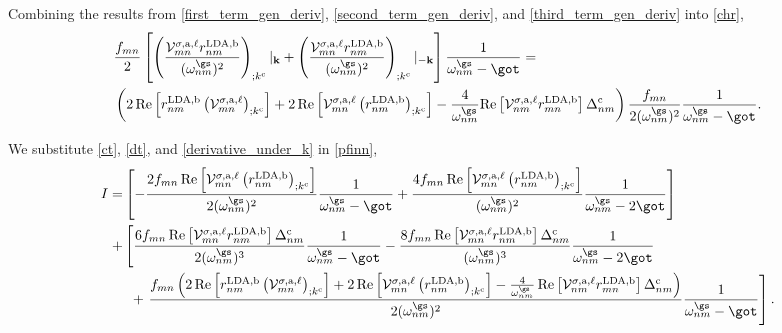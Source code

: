 Combining the results from \eqref{first_term_gen_deriv},
\eqref{second_term_gen_deriv}, and \eqref{third_term_gen_deriv}
into \eqref{chr},
\begin{align}\label{derivative_under_k}
&   \frac{f_{mn}}{2}\left[\left(\frac{\mathcal{V}^{\sigma,\text{a},\ell}_{mn}
    r^{\text{LDA,b}}_{nm}}{(\omega^\gs_{nm})^2}\right)
    _{;k^{\text{c}}}|_{\mathbf{k}} 
+   \left(\frac{\mathcal{V}^{\sigma,\text{a},\ell}_{mn}
    r^{\text{LDA,b}}_{nm}}{(\omega^\gs_{nm})^2}\right)
    _{;k^{\text{c}}}|_{-\mathbf{k}}\right]\frac{1}{\omega^\gs_{nm}-\got}
=   \nonumber\\
&   \left(2\,\mathrm{Re}\left[r^{\text{LDA,b}}_{nm}
    \left(\mathcal{V}^{\sigma,\text{a},\ell}_{mn}\right)_{;k^{\text{c}}}\right]
+   2\,\mathrm{Re}\left[\mathcal{V}^{\sigma,\text{a},\ell}_{mn}
    \left(r^{\text{LDA,b}}_{nm}\right)_{;k^{\text{c}}}\right] 
-   \frac{4}{\omega^{\gs}_{nm}}\mathrm{Re}
    \left[\mathcal{V}^{\sigma,\text{a},\ell}_{nm}r^{\text{LDA,b}}_{mn}\right]
    \Delta_{nm}^{\text{c}}\right)\frac{f_{mn}}{2(\omega^{\gs}_{nm})^{2}}
    \frac{1}{\omega^\gs_{nm}-\got}
.
\end{align}

We substitute \eqref{ct}, \eqref{dt}, and \eqref{derivative_under_k} in 
\eqref{pfinn},
\begin{align*}
I
=   &\left[-\frac{2f_{mn}\,\mathrm{Re}
    \left[\mathcal{V}^{\sigma,\text{a},\ell}_{mn}
    \left(r^{\text{LDA,b}}_{nm}\right)_{;k^{\text{c}}}\right]}
    {2(\omega^{\gs}_{nm})^{2}}\frac{1}{\omega^{\gs}_{nm}-\got} 
+   \frac{4f_{mn}\,\mathrm{Re}\left[\mathcal{V}^{\sigma,\text{a},\ell}_{mn}
    \left(r^{\text{LDA,b}}_{nm}\right)_{;k^{\text{c}}}\right]}
    {(\omega^{\gs}_{nm})^{2}}\frac{1}{\omega^{\gs}_{nm}-2\got}\right]\nonumber\\
+   &\left[\frac{6f_{mn}\,\mathrm{Re}
    \left[\mathcal{V}^{\sigma,\text{a},\ell}_{mn}r^{\text{LDA,b}}_{nm}\right]
    \Delta^{\text{c}}_{nm}}{2(\omega^{\gs}_{nm})^{3}}
    \frac{1}{\omega^{\gs}_{nm}-\got} 
-   \frac{8f_{mn}\,\mathrm{Re}
    \left[\mathcal{V}^{\sigma,\text{a},\ell}_{mn}r^{\text{LDA,b}}_{nm}\right]
    \Delta^{\text{c}}_{nm}}{(\omega^{\gs}_{nm})^{3}}
    \frac{1}{\omega^{\gs}_{nm}-2\got}\right.\nonumber\\
&\,\,\,+ 
    \left.\frac{f_{mn}\left(2\,\mathrm{Re}\left[r^{\text{LDA,b}}_{nm}
    \left(\mathcal{V}^{\sigma,\text{a},\ell}_{mn}\right)_{;k^{\text{c}}}\right]
+   2\,\mathrm{Re}\left[\mathcal{V}^{\sigma,\text{a},\ell}_{mn}
    \left(r^{\text{LDA,b}}_{nm}\right)_{;k^{\text{c}}}\right] 
-   \frac{4}{\omega^{\gs}_{nm}}\,\mathrm{Re}
    \left[\mathcal{V}^{\sigma,\text{a},\ell}_{nm}r^{\text{LDA,b}}_{mn}\right]
    \Delta_{nm}^{\text{c}}\right)}{2(\omega^{\gs}_{nm})^{2}}
    \frac{1}{\omega^\gs_{nm}-\got}\right]
.
\end{align*}

